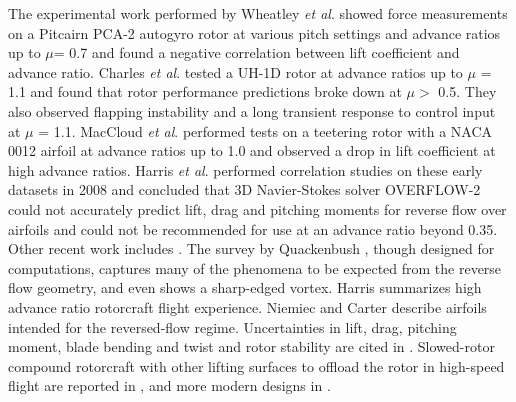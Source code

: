 \documentclass[%
 reprint,
 showkeys,
 amsmath,amssymb,
 aps,
]{revtex4-1}
\begin{document}
The experimental work performed by Wheatley \textit{et al}. \cite{15WheatleyNACA1936} showed force measurements on a Pitcairn PCA-2 autogyro rotor at various pitch settings and advance ratios up to $\mu$= 0.7 and found a negative correlation between lift coefficient and advance ratio. Charles \textit{et al}. \cite{16CharlesDTIC-1969} tested a UH-1D rotor at advance ratios up to $\mu$ = 1.1 and found that rotor performance predictions broke down at $\mu >$ 0.5. They also observed flapping instability and a long transient response to control input at $\mu$ = 1.1. MacCloud \textit{et al}. \cite{17MacCloudNASA-1968} performed tests on a teetering rotor with a NACA 0012 airfoil at advance ratios up to 1.0 and observed a drop in lift coefficient at high advance ratios. Harris \textit{et al}. \cite{18HarrisNASA-2008} performed correlation studies on these early datasets in 2008 and concluded that 3D Navier-Stokes solver OVERFLOW-2 could not accurately predict lift, drag and pitching moments for reverse flow over airfoils and could not be recommended for use at an advance ratio beyond 0.35. Other recent work includes \cite{18HarrisNASA-2008,19QuackenbushAHS-2011,20PostdamAHS-2012,21DattaJAC-2006, 22FlaxJAC-2012,23NiemiecSMS-2014,24Carter-2001}. The survey by Quackenbush \cite{19QuackenbushAHS-2011}, though designed for computations, captures many of the phenomena to be expected from the reverse flow geometry, and even shows a sharp-edged vortex. Harris \cite{18HarrisNASA-2008} summarizes high advance ratio rotorcraft flight experience. Niemiec \cite{23NiemiecSMS-2014} and Carter \cite{24Carter-2001} describe airfoils intended for the reversed-flow regime. Uncertainties in lift, drag, pitching moment, blade bending and twist and rotor stability are cited in \cite{25MeyerDTIC-1953, 26SweetNACA-1964}. Slowed-rotor compound rotorcraft with other lifting surfaces to offload the rotor in high-speed flight are reported in \cite{8EwansDTIC-1973, 15WheatleyNACA1936, 16CharlesDTIC-1969, 17MacCloudNASA-1968, 27Hislop-1958, 28WheatleyNACA-1936, 29LandgrebeAHS-1977, 30FlorosAHA-2009, 31Newman-AEAT1997, 32WarwickFI-2005, 33HarrisAHS-1970}, and more modern designs in \cite{5WalshAHS-2011, 34BagaiAHS-2008}. 
\end{document}
